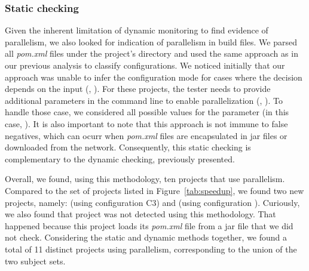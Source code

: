 
\subsubsection{Static checking}
\label{sec:rqC-2}
Given the inherent limitation of dynamic monitoring to find evidence
of parallelism, we also looked for indication of parallelism in build
files.  We
parsed all \emph{pom.xml} files under the project's directory and used
the same approach as in our previous analysis to classify
configurations.  We noticed initially that our approach was unable to
infer the configuration mode for cases where the decision depends on
the input (\eg,
). For these
projects, the tester needs to provide additional parameters in the
command line to enable parallelization (\eg, ). To handle those case, we
considered all possible values for the parameter (in this case,
).  It is also important to note that this
approach is not immune to false negatives, which can ocurr when
\emph{pom.xml} files are encapsulated in jar files or downloaded from
the network.  Consequently, this static checking is complementary to
the dynamic checking, previously presented.

Overall, we found, using this methodology, ten projects that use
parallelism.  Compared to the set of projects listed in
Figure~\ref{tab:speedup}, we found two new projects, namely:
 (using
configuration C3) and  (using configuration
\ForkSeq{}).  Curiously, we also found that project  was
not detected using this methodology.  That happened because this
project loads its \emph{pom.xml} file from a jar file that we did not
check.  Considering the static and dynamic methods together, we found
a total of 11 distinct projects using parallelism, corresponding to
the union of the two subject sets.

\vspace{1ex}
\begin{center}
\end{center}
\vspace{1ex}

